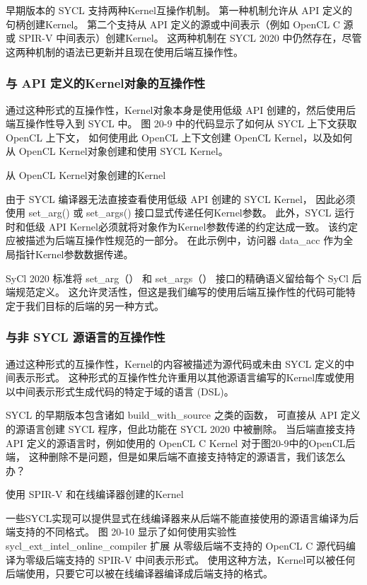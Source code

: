 早期版本的 SYCL 支持两种Kernel互操作机制。 第一种机制允许从 API 定义的句柄创建Kernel。 
第二个支持从 API 定义的源或中间表示（例如 OpenCL C 源或 SPIR-V 中间表示）创建Kernel。 
这两种机制在 SYCL 2020 中仍然存在，尽管这两种机制的语法已更新并且现在使用后端互操作性。

\subsubsection{与 API 定义的Kernel对象的互操作性}
通过这种形式的互操作性，Kernel对象本身是使用低级 API 创建的，然后使用后端互操作性导入到 SYCL 中。 
图 20-9 中的代码显示了如何从 SYCL 上下文获取 OpenCL 上下文，
如何使用此 OpenCL 上下文创建 OpenCL Kernel，以及如何从 OpenCL Kernel对象创建和使用 SYCL Kernel。

{\color{red} 从 OpenCL Kernel对象创建的Kernel}

由于 SYCL 编译器无法直接查看使用低级 API 创建的 SYCL Kernel，
因此必须使用 set\_arg() 或 set\_args() 接口显式传递任何Kernel参数。 
此外，SYCL 运行时和低级 API Kernel必须就将对象作为Kernel参数传递的约定达成一致。 
该约定应被描述为后端互操作性规范的一部分。 在此示例中，访问器 data\_acc 作为全局指针Kernel参数数据传递。

\begin{remark}
	SyCl 2020 标准将 set\_arg（） 和 set\_args（） 接口的精确语义留给每个 SyCl 后端规范定义。
	这允许灵活性，但这是我们编写的使用后端互操作性的代码可能特定于我们目标的后端的另一种方式。
\end{remark}

\subsubsection{与非 SYCL 源语言的互操作性}
通过这种形式的互操作性，Kernel的内容被描述为源代码或未由 SYCL 定义的中间表示形式。 
这种形式的互操作性允许重用以其他源语言编写的Kernel库或使用以中间表示形式生成代码的特定于域的语言 (DSL)。

SYCL 的早期版本包含诸如 build\_with\_source 之类的函数，
可直接从 API 定义的源语言创建 SYCL 程序，但此功能在 SYCL 2020 中被删除。
当后端直接支持 API 定义的源语言时，例如使用的 OpenCL C Kernel 对于图20-9中的OpenCL后端，
这种删除不是问题，但是如果后端不直接支持特定的源语言，我们该怎么办？

{\color{red} 使用 SPIR-V 和在线编译器创建的Kernel}

一些SYCL实现可以提供显式在线编译器来从后端不能直接使用的源语言编译为后端支持的不同格式。 
图 20-10 显示了如何使用实验性 sycl\_ext\_intel\_online\_compiler 扩展
从零级后端不支持的 OpenCL C 源代码编译为零级后端支持的 SPIR-V 中间表示形式。 
使用这种方法，Kernel可以被任何后端使用，只要它可以被在线编译器编译成后端支持的格式。

